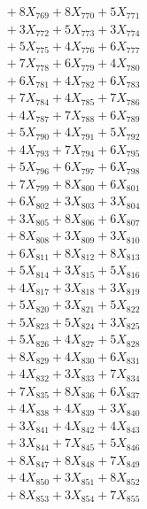 \documentclass[a4paper,10pt]{article}
\begin{document}
{\begin{align}
&\;  + 8 X_{769} + 8 X_{770} + 5 X_{771} \\[0.3ex]
&\;  + 3 X_{772} + 5 X_{773} + 3 X_{774} \\[0.3ex]
&\;  + 5 X_{775} + 4 X_{776} + 6 X_{777} \\[0.3ex]
&\;  + 7 X_{778} + 6 X_{779} + 4 X_{780} \\[0.3ex]
&\;  + 6 X_{781} + 4 X_{782} + 6 X_{783} \\[0.3ex]
&\;  + 7 X_{784} + 4 X_{785} + 7 X_{786} \\[0.3ex]
&\;  + 4 X_{787} + 7 X_{788} + 6 X_{789} \\[0.5ex]\allowbreak
&\;  + 5 X_{790} + 4 X_{791} + 5 X_{792} \\[0.3ex]
&\;  + 4 X_{793} + 7 X_{794} + 6 X_{795} \\[0.3ex]
&\;  + 5 X_{796} + 6 X_{797} + 6 X_{798} \\[0.3ex]
&\;  + 7 X_{799} + 8 X_{800} + 6 X_{801} \\[0.3ex]
&\;  + 6 X_{802} + 3 X_{803} + 3 X_{804} \\[0.3ex]
&\;  + 3 X_{805} + 8 X_{806} + 6 X_{807} \\[0.3ex]
&\;  + 8 X_{808} + 3 X_{809} + 3 X_{810} \\[0.3ex]
&\;  + 6 X_{811} + 8 X_{812} + 8 X_{813} \\[0.3ex]
&\;  + 5 X_{814} + 3 X_{815} + 5 X_{816} \\[0.3ex]
&\;  + 4 X_{817} + 3 X_{818} + 3 X_{819} \\[0.5ex]\allowbreak
&\;  + 5 X_{820} + 3 X_{821} + 5 X_{822} \\[0.3ex]
&\;  + 5 X_{823} + 5 X_{824} + 3 X_{825} \\[0.3ex]
&\;  + 5 X_{826} + 4 X_{827} + 5 X_{828} \\[0.3ex]
&\;  + 8 X_{829} + 4 X_{830} + 6 X_{831} \\[0.3ex]
&\;  + 4 X_{832} + 3 X_{833} + 7 X_{834} \\[0.3ex]
&\;  + 7 X_{835} + 8 X_{836} + 6 X_{837} \\[0.3ex]
&\;  + 4 X_{838} + 4 X_{839} + 3 X_{840} \\[0.3ex]
&\;  + 3 X_{841} + 4 X_{842} + 4 X_{843} \\[0.3ex]
&\;  + 3 X_{844} + 7 X_{845} + 5 X_{846} \\[0.3ex]
&\;  + 8 X_{847} + 8 X_{848} + 7 X_{849} \\[0.5ex]\allowbreak
&\;  + 4 X_{850} + 3 X_{851} + 8 X_{852} \\[0.3ex]
&\;  + 8 X_{853} + 3 X_{854} + 7 X_{855} \\[0.3ex]

\end{align}}
\end{document}

